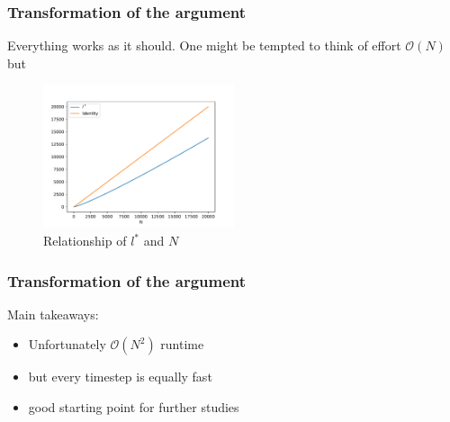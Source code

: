 \documentclass[12pt,a4paper,handout]{beamer}
\theoremstyle{definition}
\theoremstyle{plain}
\begin{document}
\begin{frame}
    \frametitle{Transformation of the argument}
    Everything works as it should. One might be tempted to think of effort $\mathcal{O}(N)$ but
    \begin{figure}
        \centering
        \includegraphics[width=0.5\textwidth]{runtime}
        \caption{Relationship of $l^*$ and $N$}
    \end{figure}
\end{frame}
\begin{frame}
    \frametitle{Transformation of the argument}
    Main takeaways:
    \begin{itemize}
       \item Unfortunately $\mathcal{O}(N^2)$ runtime
       \item but every timestep is equally fast
       \item good starting point for further studies
    \end{itemize}
\end{frame}
\end{document}
